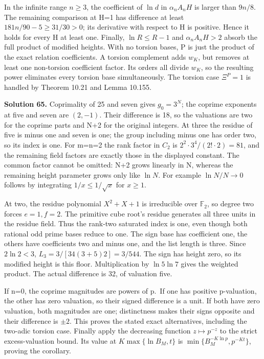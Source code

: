 \documentclass[
  11pt,
  a4paper,
]{article}
\begin{document}
In the infinite range \(n\ge3\), the coefficient of \(\ln d\) in
\(\alpha_nA_nH\) is larger than \(9n/8\). The remaining comparison at
H=1 has difference at least \(181n/90-5\ge31/30>0\); its derivative with
respect to H is positive. Hence it holds for every H at least one.
Finally, \(\ln R\le R-1\) and \(\alpha_nA_nH>2\) absorb the full product
of modified heights. With no torsion bases, P is just the product of the
exact relation coefficients. A torsion complement adds \(w_K\), but
removes at least one non-torsion coefficient factor. Its orders all
divide \(w_K\), so the resulting power eliminates every torsion base
simultaneously. The torsion case \(\Xi^P=1\) is handled by Theorem 10.21
and Lemma 10.155.

\textbf{Solution 65.} Coprimality of 25 and seven gives \(g_0=3^N\); the
coprime exponents at five and seven are \((2,-1)\). Their difference is
18, so the valuations are two for the coprime parts and N+2 for the
original integers. At three the residue of five is minus one and seven
is one; the group including minus one has order two, so its index is
one. For m=n=2 the rank factor in \(C_2\) is
\(2^2\cdot3^4/(2!\cdot2)=81\), and the remaining field factors are
exactly those in the displayed constant. The common factor cannot be
omitted: N+2 grows linearly in N, whereas the remaining height parameter
grows only like \(\ln N\). For example \(\ln N/N\to0\) follows by
integrating \(1/x\le1/\sqrt x\) for \(x\ge1\).

At two, the residue polynomial \(X^2+X+1\) is irreducible over
\(\mathbb F_2\), so degree two forces \(e=1,f=2\). The primitive cube
root's residue generates all three units in the residue field. Thus the
rank-two saturated index is one, even though both rational odd prime
bases reduce to one. The sign base has coefficient one, the others have
coefficients two and minus one, and the list length is three. Since
\(2\ln2<3\), \(L_3=3/[34(3+5)2]=3/544\). The sign has height zero, so
its modified height is this floor. Multiplication by \(\ln5\ln7\) gives
the weighted product. The actual difference is 32, of valuation five.

If n=0, the coprime magnitudes are powers of p.~If one has positive
p-valuation, the other has zero valuation, so their signed difference is
a unit. If both have zero valuation, both magnitudes are one;
distinctness makes their signs opposite and their difference is
\(\pm2\). This proves the stated exact alternatives, including the
two-adic torsion case. Finally apply the decreasing function
\(z\mapsto p^{-z}\) to the strict excess-valuation bound. Its value at
\(K\max\{\ln B_M,t\}\) is \(\min\{B_M^{-K\ln p},p^{-Kt}\}\), proving the
corollary.
\end{document}
